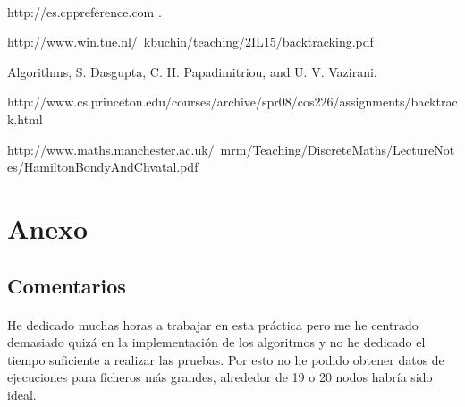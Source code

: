 \documentclass[es]{ifirak}
\begin{document}
\paragraph{}

\pagebreak

\begin{thebibliography}{arauak}
	
	 http://es.cppreference.com .
	
	 http://www.win.tue.nl/~kbuchin/teaching/2IL15/backtracking.pdf
	
	 Algorithms, S. Dasgupta, C. H. Papadimitriou, and U. V. Vazirani.
	
	http://www.cs.princeton.edu/courses/archive/spr08/cos226/assignments/backtrack.html
	
	 http://www.maths.manchester.ac.uk/~mrm/Teaching/DiscreteMaths/LectureNotes/HamiltonBondyAndChvatal.pdf
	
\end{thebibliography}

\section{Anexo}
	\subsection{Comentarios}
		\paragraph{}
		He dedicado muchas horas a trabajar en esta práctica pero me he centrado demasiado quizá en la implementación de los algoritmos y no he dedicado el tiempo suficiente a realizar las pruebas. Por esto no he podido obtener datos de ejecuciones para ficheros más grandes, alrededor de 19 o 20 nodos habría sido ideal. 
\end{document}
